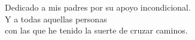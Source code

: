
\thispagestyle{empty}


\vspace*{3cm}

\begin{center}
Dedicado a mis padres por su apoyo incondicional. \\
\medskip
Y a todas aquellas personas \\
con las que he tenido la suerte de cruzar caminos. \\ \medskip
\end{center}

\medskip

